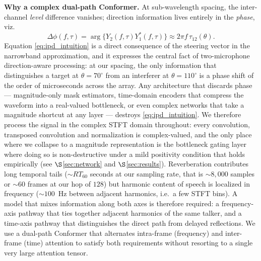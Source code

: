 \documentclass[journal,10pt]{IEEEtran}
\begin{document}
\textbf{Why a complex dual-path Conformer.} At sub-wavelength spacing, the inter-channel \emph{level} difference vanishes; direction information lives entirely in the \emph{phase}, viz.\
\begin{equation}
\Delta\phi(f,\tau)=\arg\{Y_2(f,\tau)Y_1^\ast(f,\tau)\}\approx 2\pi f\,\tau_{12}(\theta).
\label{eq:ipd_intuition}
\end{equation}
Equation \eqref{eq:ipd_intuition} is a direct consequence of the steering vector in the narrowband approximation, and it expresses the central fact of two-microphone direction-aware processing: at our spacing, the only information that distinguishes a target at \(\theta=70^\circ\) from an interferer at \(\theta=110^\circ\) is a phase shift of the order of microseconds across the array. Any architecture that discards phase --- magnitude-only mask estimators, time-domain encoders that compress the waveform into a real-valued bottleneck, or even complex networks that take a magnitude shortcut at any layer --- destroys \eqref{eq:ipd_intuition}. We therefore process the signal in the complex STFT domain throughout: every convolution, transposed convolution and normalization is complex-valued, and the only place where we collapse to a magnitude representation is the bottleneck gating layer where doing so is non-destructive under a mild positivity condition that holds empirically (see $\S$\ref{sec:network} and $\S$\ref{sec:results}). Reverberation contributes long temporal tails (\(\sim\!RT_{60}\) seconds at our sampling rate, that is \(\sim\!8{,}000\) samples or \(\sim\!60\) frames at our hop of \(128\)) but harmonic content of speech is localized in frequency (\(\sim\!100\)~Hz between adjacent harmonics, i.e.\ a few STFT bins). A model that mixes information along both axes is therefore required: a frequency-axis pathway that ties together adjacent harmonics of the same talker, and a time-axis pathway that distinguishes the direct path from delayed reflections. We use a dual-path Conformer that alternates intra-frame (frequency) and inter-frame (time) attention to satisfy both requirements without resorting to a single very large attention tensor.
\end{document}
